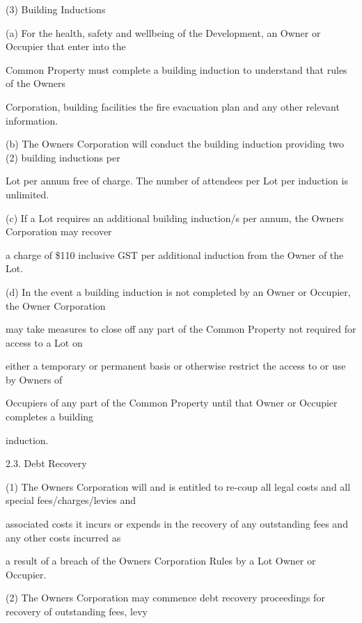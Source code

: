 \documentclass{article}
\begin{document}
{\fontsize{9.962}{1}(3) Building Inductions }

{\fontsize{9.962}{1}(a) For the health, safety and wellbeing of the Development, an Owner or Occupier that enter into the }

{\fontsize{10.02}{1}Common Property must complete a building induction to understand that rules of the Owners }

{\fontsize{10.02}{1}Corporation, building facilities the fire evacuation plan and any other relevant information. }

{\fontsize{9.962}{1}(b) The Owners Corporation will conduct the building induction providing two (2) building inductions per }

{\fontsize{10.02}{1}Lot per annum free of charge. The number of attendees per Lot per induction is unlimited. }

{\fontsize{9.962}{1}(c) If a Lot requires an additional building induction/s per annum, the Owners Corporation may recover }

{\fontsize{10.02}{1}a charge of \$110 inclusive GST per additional induction from the Owner of the Lot. }

{\fontsize{9.962}{1}(d) In the event a building induction is not completed by an Owner or Occupier, the Owner Corporation }

{\fontsize{10.02}{1}may take measures to close off any part of the Common Property not required for access to a Lot on }

{\fontsize{10.02}{1}either a temporary or permanent basis or otherwise restrict the access to or use by Owners of }

{\fontsize{10.02}{1}Occupiers of any part of the Common Property until that Owner or Occupier completes a building }

{\fontsize{10.02}{1}induction. }

{\fontsize{9.99}{1}2.3. Debt Recovery }

{\fontsize{9.962}{1}(1) The Owners Corporation will and is entitled to re-coup all legal costs and all special fees/charges/levies and }

{\fontsize{10.02}{1}associated costs it incurs or expends in the recovery of any outstanding fees and any other costs incurred as }

{\fontsize{10.02}{1}a result of a breach of the Owners Corporation Rules by a Lot Owner or Occupier. }

{\fontsize{9.962}{1}(2) The Owners Corporation may commence debt recovery proceedings for recovery of outstanding fees, levy }
\end{document}
